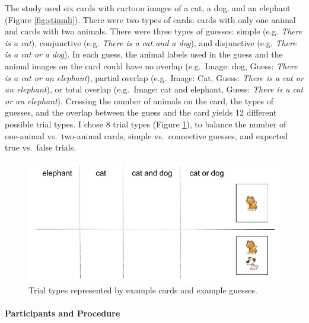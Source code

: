 \documentclass[man]{apa6}
\theoremstyle{definition}
\theoremstyle{definition}
\theoremstyle{definition}
\theoremstyle{remark}
\begin{document}
The study used six cards with cartoon images of a cat, a dog, and an
elephant (Figure \ref{fig:stimuli}). There were two types of cards:
cards with only one animal and cards with two animals. There were three
types of guesses: simple (e.g. \emph{There is a cat}), conjunctive (e.g.
\emph{There is a cat and a dog}), and disjunctive (e.g. \emph{There is a
cat or a dog}). In each guess, the animal labels used in the guess and
the animal images on the card could have no overlap (e.g.~Image: dog,
Guess: \emph{There is a cat or an elephant}), partial overlap
(e.g.~Image: Cat, Guess: \emph{There is a cat or an elephant}), or total
overlap (e.g.~Image: cat and elephant, Guess: \emph{There is a cat or an
elephant}). Crossing the number of animals on the card, the types of
guesses, and the overlap between the guess and the card yields 12
different possible trial types. I chose 8 trial types (Figure
\ref{fig:trials}), to balance the number of one-animal vs.~two-animal
cards, simple vs.~connective guesses, and expected true vs.~false
trials.

\begin{figure}[t]

{\centering \includegraphics{figs/trials-1} 

}

\caption{Trial types represented by example cards and example guesses.}\label{fig:trials}
\end{figure}

\paragraph{Participants and Procedure}\label{participants-and-procedure}
\end{document}
